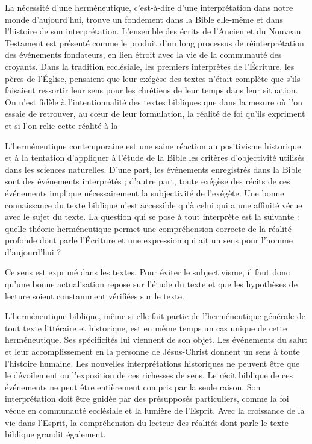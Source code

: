 La nécessité d'une herméneutique, c'est-à-dire d'une interprétation dans notre monde d'aujourd'hui, trouve un fondement dans la Bible elle-même et dans l'histoire de son interprétation. L'ensemble des écrits de l'Ancien et du Nouveau Testament est présenté comme le produit d'un long processus de réinterprétation des événements fondateurs, en lien étroit avec la vie de la communauté des croyants. Dans la tradition ecclésiale, les premiers interprètes de l'Écriture, les pères de l'Église, pensaient que leur exégèse des textes n'était complète que s'ils faisaient ressortir leur sens pour les chrétiens de leur temps dans leur situation. On n'est fidèle à l'intentionnalité des textes bibliques que dans la mesure où l'on essaie de retrouver, au cœur de leur formulation, la réalité de foi qu'ils expriment et si l'on relie cette réalité à la   

L'herméneutique contemporaine est une saine réaction au positivisme historique et à la tentation d'appliquer à l'étude de la Bible les critères d'objectivité utilisés dans les sciences naturelles. D'une part, les événements enregistrés dans la Bible sont des événements interprétés ; d'autre part, toute exégèse des récits de ces événements implique nécessairement la subjectivité de l'exégète. Une bonne connaissance du texte biblique n'est accessible qu'à celui qui a une affinité vécue avec le sujet du texte. La question qui se pose à tout interprète est la suivante : quelle théorie herméneutique permet une compréhension correcte de la réalité profonde dont parle l'Écriture et une expression qui ait un sens pour l'homme d'aujourd'hui ?   

 

Ce sens est exprimé dans les textes. Pour éviter le subjectivisme, il faut donc qu'une bonne actualisation repose sur l'étude du texte et que les hypothèses de lecture soient constamment vérifiées sur le texte.   

L'herméneutique biblique, même si elle fait partie de l'herméneutique générale de tout texte littéraire et historique, est en même temps un cas unique de cette herméneutique. Ses spécificités lui viennent de son objet. Les événements du salut et leur accomplissement en la personne de Jésus-Christ donnent un sens à toute l'histoire humaine. Les nouvelles interprétations historiques ne peuvent être que le dévoilement ou l'exposition de ces richesses de sens. Le récit biblique de ces événements ne peut être entièrement compris par la seule raison. Son interprétation doit être guidée par des présupposés particuliers, comme la foi vécue en communauté ecclésiale et la lumière de l'Esprit. Avec la croissance de la vie dans l'Esprit, la compréhension du lecteur des réalités dont parle le texte biblique grandit également. 

